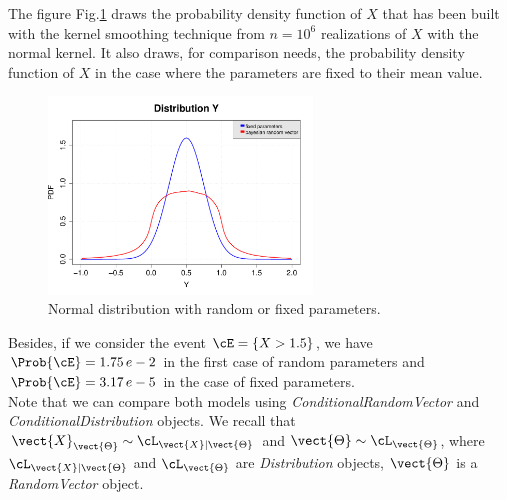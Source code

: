 The figure Fig.\ref{DensitCond} draws the probability density function of $X$ that has been built with the kernel smoothing technique from $n=10^6$ realizations of $X$ with the normal kernel. It also draws, for comparison needs, the probability density function of $X$ in the case where the parameters are fixed to their mean value.\\

\begin{figure}[H]
  \begin{center}
    \includegraphics[width=7cm]{Figures/pdf_bayesianRandomVector.pdf}
    \caption{Normal distribution with random or fixed parameters.}
    \label{DensitCond}
  \end{center}
\end{figure}

Besides, if we consider the event $\cE = \{X > 1.5\}$, we have $\Prob{\cE}= 1.75\, e-2$ in the first case of random parameters and $\Prob{\cE}= 3.17\, e-5$ in the case of fixed parameters.\\

Note that we can compare both models using {\itshape ConditionalRandomVector} and {\itshape ConditionalDistribution} objects. We recall that $\vect{X}_{\vect{\Theta}} \sim \cL_{\vect{X}|\vect{\Theta}}$ and $\vect{\Theta} \sim \cL_{\vect{\Theta}}$, where
$\cL_{\vect{X}|\vect{\Theta}}$ and $\cL_{\vect{\Theta}}$ are {\itshape Distribution} objects, $\vect{\Theta}$ is a {\itshape RandomVector} object.\\

